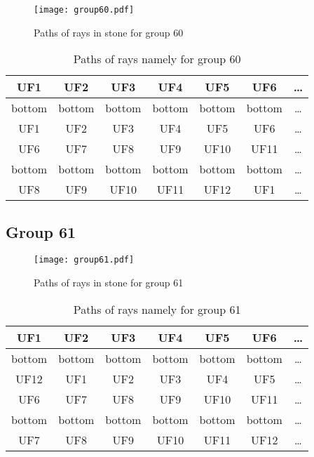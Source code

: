 \begin{figure}[h!]
\centering
\texttt{[image: group60.pdf]}
\caption{Paths of rays in stone for group 60}
\label{table:FigGroup60}
\end{figure}



\begin{table}[h!]
\centering
\begin{tabular}{|c|c|c|c|c|c|c|}
\hline
UF1 & UF2 & UF3 & UF4 & UF5 & UF6 & \dots \\
\hline
bottom & bottom & bottom & bottom & bottom & bottom & \dots \\
\hline
UF1 & UF2 & UF3 & UF4 & UF5 & UF6 & \dots \\
\hline
UF6 & UF7 & UF8 & UF9 & UF10 & UF11 & \dots \\
\hline
bottom & bottom & bottom & bottom & bottom & bottom & \dots \\
\hline
UF8 & UF9 & UF10 & UF11 & UF12 & UF1 & \dots \\
\hline
\end{tabular}
\caption{Paths of rays namely for group 60}
\label{table:TableGroup60}
\end{table}
\newpage
\subsection*{Group 61}






\begin{figure}[h!]
\centering
\texttt{[image: group61.pdf]}
\caption{Paths of rays in stone for group 61}
\label{table:FigGroup61}
\end{figure}



\begin{table}[h!]
\centering
\begin{tabular}{|c|c|c|c|c|c|c|}
\hline
UF1 & UF2 & UF3 & UF4 & UF5 & UF6 & \dots \\
\hline
bottom & bottom & bottom & bottom & bottom & bottom & \dots \\
\hline
UF12 & UF1 & UF2 & UF3 & UF4 & UF5 & \dots \\
\hline
UF6 & UF7 & UF8 & UF9 & UF10 & UF11 & \dots \\
\hline
bottom & bottom & bottom & bottom & bottom & bottom & \dots \\
\hline
UF7 & UF8 & UF9 & UF10 & UF11 & UF12 & \dots \\
\hline
\end{tabular}
\caption{Paths of rays namely for group 61}
\label{table:TableGroup61}
\end{table}
\newpage
